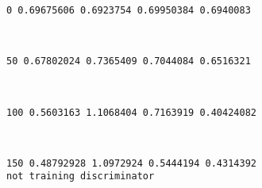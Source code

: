 \documentclass[11pt]{article}
\begin{document}
    \begin{Verbatim}[commandchars=\\\{\}]
0 0.69675606 0.6923754 0.69950384 0.6940083

    \end{Verbatim}

    \begin{center}
    \end{center}
    { \hspace*{\fill} \\}
    
    \begin{Verbatim}[commandchars=\\\{\}]
50 0.67802024 0.7365409 0.7044084 0.6516321

    \end{Verbatim}

    \begin{center}
    \end{center}
    { \hspace*{\fill} \\}
    
    \begin{Verbatim}[commandchars=\\\{\}]
100 0.5603163 1.1068404 0.7163919 0.40424082

    \end{Verbatim}

    \begin{center}
    \end{center}
    { \hspace*{\fill} \\}
    
    \begin{Verbatim}[commandchars=\\\{\}]
150 0.48792928 1.0972924 0.5444194 0.4314392
not training discriminator

    \end{Verbatim}

    \begin{center}
    \end{center}
    { \hspace*{\fill} \\}
    
\end{document}
